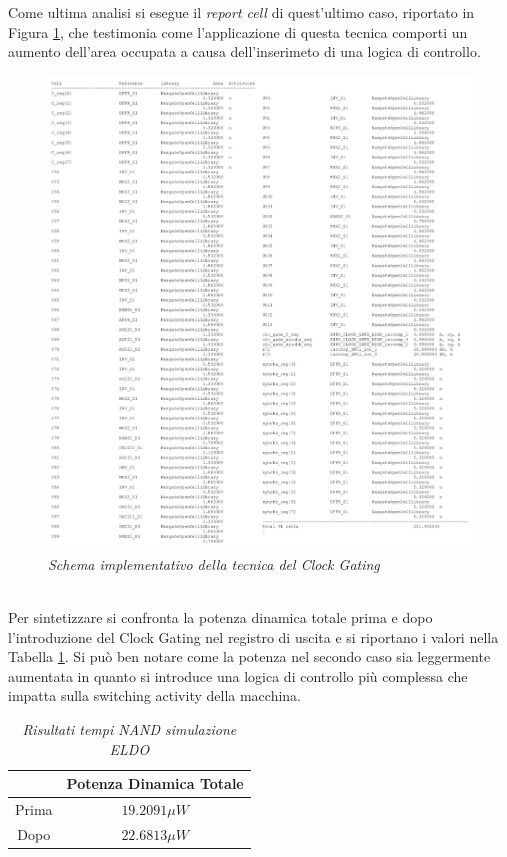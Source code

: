 Come ultima analisi si esegue il \textit{report cell} di quest'ultimo caso, riportato in Figura \ref{elsif10}, che testimonia come l'applicazione di questa tecnica comporti un aumento dell'area occupata a causa dell'inserimeto di una logica di controllo.
\begin{figure}[!htb]
	\centering
	\includegraphics[scale=0.28]{immagini/elsif10}
	\caption{\textit{Schema implementativo della tecnica del Clock Gating}}
	\label{elsif10}
\end{figure}
\\
Per sintetizzare si confronta la potenza dinamica totale prima e dopo l'introduzione del Clock Gating nel registro di uscita e si riportano i valori nella Tabella \ref{Tab3_1}. Si può ben notare come la potenza nel secondo caso sia leggermente aumentata in quanto si introduce una logica di controllo più complessa che impatta sulla switching activity della macchina.
\begin{table}[!h]\footnotesize
	\centering
	\begin{tabular}{|c|c|}
		\hline
		& \textbf{Potenza Dinamica Totale}\\
		\hline
		Prima & $19.2091 \mu W$\\
		Dopo & $22.6813 \mu W$\\
		\hline
	\end{tabular}
	\caption{\textit{Risultati tempi NAND simulazione ELDO}}
	\label{Tab3_1}
\end{table}

